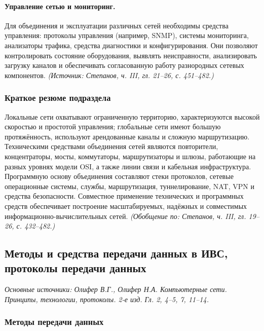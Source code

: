 \documentclass[a4paper,12pt]{article}
\begin{document}
\paragraph{Управление сетью и мониторинг.}
Для объединения и эксплуатации различных сетей необходимы средства управления: протоколы управления (например, SNMP), системы мониторинга, анализаторы трафика, средства диагностики и конфигурирования. Они позволяют контролировать состояние оборудования, выявлять неисправности, анализировать загрузку каналов и обеспечивать согласованную работу разнородных сетевых компонентов.
\textit{(Источник: Степанов, ч. III, гл. 21–26, с. 451–482.)}

\subsubsection{Краткое резюме подраздела}
Локальные сети охватывают ограниченную территорию, характеризуются высокой скоростью и простотой управления; глобальные сети имеют большую протяжённость, используют арендованные каналы и сложную маршрутизацию. Техническими средствами объединения сетей являются повторители, концентраторы, мосты, коммутаторы, маршрутизаторы и шлюзы, работающие на разных уровнях модели OSI, а также линии связи и кабельная инфраструктура. Программную основу объединения составляют стеки протоколов, сетевые операционные системы, службы, маршрутизация, туннелирование, NAT, VPN и средства безопасности. Совместное применение технических и программных средств обеспечивает построение масштабируемых, надёжных и совместимых информационно-вычислительных сетей.
\textit{(Обобщение по: Степанов, ч. III, гл. 19–26, с. 432–482.)}

\subsection{Методы и средства передачи данных в ИВС, протоколы передачи данных}

\noindent\textit{Основные источники: Олифер В.Г., Олифер Н.А. Компьютерные сети. Принципы, технологии, протоколы. 2-е изд. Гл. 2, 4–5, 7, 11–14.}

\subsubsection{Методы передачи данных}
\end{document}
